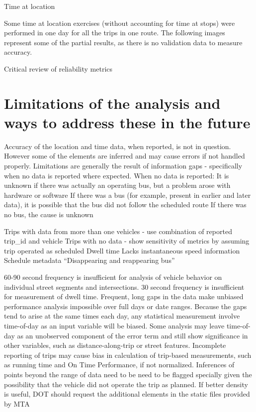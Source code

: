 \documentclass[12pt,journal,compsoc]{IEEEtran}
\begin{document}
Time at location

Some time at location exercises (without accounting for time at stops) were performed in one day for all the trips in one route. The following images represent some of the partial results, as there is no validation data to measure accuracy.








Critical review of reliability metrics



\section{Limitations of the analysis and ways to address these in the future}
Accuracy of the location and time data, when reported, is not in question. However some of the elements are inferred and may cause errors if not handled properly.
Limitations are generally the result of information gaps - specifically when no data is reported where expected.
When no data is reported:
It is unknown if there was actually an operating bus, but a problem arose with hardware or software
If there was a bus (for example, present in earlier and later data), it is possible that the bus did not follow the scheduled route
If there was no bus, the cause is unknown

Trips with data from more than one vehicles - use combination of reported trip\_id and vehicle
Trips with no data - show sensitivity of metrics by assuming trip operated as scheduled
Dwell time
Lacks instantaneous speed information
Schedule metadata
“Disappearing and reappearing bus” 

60-90 second frequency is insufficient for analysis of vehicle behavior on individual street segments and intersections.
30 second frequency is insufficient for measurement of dwell time.
Frequent, long gaps in the data make unbiased performance analysis impossible over full days or date ranges.  Because the gaps tend to arise at the same times each day, any statistical measurement involve time-of-day as an input variable will be biased.  Some analysis may leave time-of-day as an unobserved component of the error term and still show significance in other variables, such as distance-along-trip or street features.
Incomplete reporting of trips may cause bias in calculation of trip-based measurements, such as running time and On Time Performance, if not normalized.
Inferences of points beyond the range of data need to be need to be flagged specially given the possibility that the vehicle did not operate the trip as planned.
If better density is useful, DOT should request the additional elements in the static files provided by MTA
\end{document}

